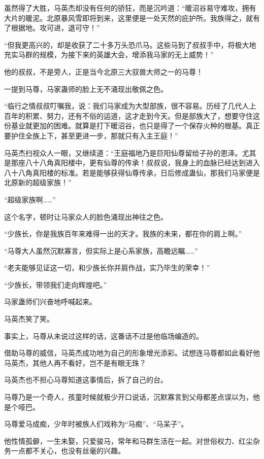 
\begin{this_body}

虽然得了大胜，马英杰却没有任何的骄狂，而是沉吟道：“暖沼谷易守难攻，拥有大片的暖泥。北原暴风雪即将到来，这里便是一处天然的庇护所。我族得之，就有了根据地。攻可进，退可守！”

“但我更高兴的，却是收获了二十多万头恐爪马。这些马到了叔叔手中，将极大地充实马群的规模，为接下来的英雄大会，增添我马家的无上威势！”

他的叔叔，不是旁人，正是当今北原三大驭兽大师之一的马尊！

一提到马尊，马家蛊师的脸上无不涌现出敬佩之色。

“临行之情叔叔叮嘱我，说：我们马家成为大型部族，很不容易。历经了几代人上百年的积累、努力，还有不俗的运道，这才走到今天。但是部族大了，想要守住这份基业就更加的困难。就算是打下暖沼谷，也只是得了一个保存火种的根基。真正要护住全族上下，甚至更进一步，那就只有入主王庭！”

马英杰扫视众人一眼，又继续道：“王庭福地乃是巨阳仙尊留给子孙的恩泽。尤其是那座八十八角真阳楼中，更有仙尊的传承！叔叔说，我身上的血脉已经达到进入八十八角真阳楼的标准。若是能够获得仙尊传承，日后修成蛊仙，那我们马家便是北原新的超级家族！”

“超级家族啊……”

这个名字，顿时让马家众人的脸色涌现出神往之色。

“少族长，你是我族百年来难得一出的天才。我族的未来，都在你的肩上啊。”

“马尊大人虽然沉默寡言，但实际上是心系家族，高瞻远瞩……”

“老夫能够见证这一切，和少族长你并肩作战，实乃毕生的荣幸！”

“少族长，带领我们走向辉煌吧。”

马家蛊师们兴奋地呼喊起来。

马英杰笑了笑。

事实上，马尊从未说过这样的话，这番话不过是他临场编造的。

借助马尊的威信，马英杰成功地为自己的形象增光添彩。试想连马尊都如此看好他马英杰，其他人再不看好，岂不是有眼无珠？

马英杰也不担心马尊知道这事情后，拆了自己的台。

马尊乃是一个奇人，孩童时候就极少开口说话，沉默寡言到父母都差点误以为，他是个哑巴。

马尊爱马成痴，少年时被族人们戏称为“马痴”、“马呆子”。

他性情孤僻，一生未娶，只爱骏马，常年和马群生活在一起。对世俗权力、红尘杂务一点都不关心，也没有丝毫的兴趣。


\end{this_body}
